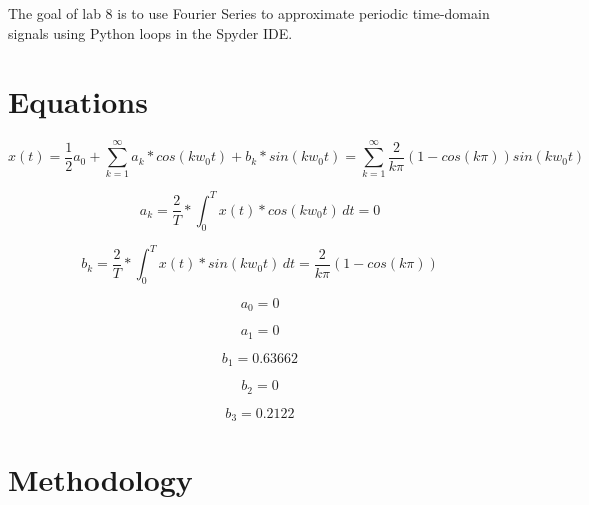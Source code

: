 \documentclass[12pt]{report}
\begin{document}
The goal of lab 8 is to use Fourier Series to approximate periodic time-domain signals using Python loops in the Spyder IDE.

\section{Equations}
    \begin{equation}
       x(t) = \frac{1}{2}a_0 + \sum_{k=1}^{\infty} a_k*cos(kw_0t) + b_k*sin(kw_0t) = \sum_{k=1}^{\infty} \frac{2}{k\pi}(1-cos(k\pi))sin(kw_0t)
    \end{equation}

    \begin{equation}
        a_k = \frac{2}{T} * \int_{0}^{T} x(t)*cos(kw_0t) \,dt = 0
    \end{equation}
    
    \begin{equation}
        b_k = \frac{2}{T} * \int_{0}^{T} x(t)*sin(kw_0t) \,dt = \frac{2}{k\pi}(1-cos(k\pi))
    \end{equation}
 
     \begin{equation}
        a_0 = 0
    \end{equation}
    
    \begin{equation}
        a_1 = 0
    \end{equation}
    
    \begin{equation}
        b_1 =  0.63662
    \end{equation}
    
    \begin{equation}
        b_2 =  0
    \end{equation}
    
    \begin{equation}
        b_3 =  0.2122
    \end{equation}
    
\section{Methodology}

\end{document}
